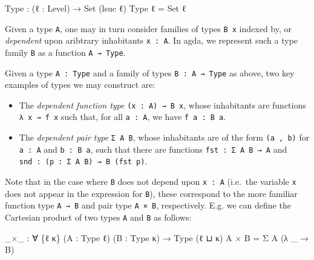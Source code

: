 \documentclass[
  11pt,
  oneside,
  article]{memoir}
\newenvironment{Shaded}{}{}
\newcommand{\DataTypeTok}[1]{\textcolor[rgb]{0.56,0.13,0.00}{#1}}
\newcommand{\NormalTok}[1]{#1}
\newcommand{\OtherTok}[1]{\textcolor[rgb]{0.00,0.44,0.13}{#1}}
\providecommand{\tightlist}{%
  \setlength{\itemsep}{0pt}\setlength{\parskip}{0pt}}
\theoremstyle{definition}
\theoremstyle{plain}
\newcommand{\0}{\textsf{0}}
\newcommand{\1}{\tn{\textsf{1}}}
\begin{document}
\begin{Shaded}
\begin{Highlighting}[]
\NormalTok{Type }\OtherTok{:} \OtherTok{(}\NormalTok{ℓ }\OtherTok{:}\NormalTok{ Level}\OtherTok{)} \OtherTok{→} \DataTypeTok{Set} \OtherTok{(}\NormalTok{lsuc ℓ}\OtherTok{)}
\NormalTok{Type ℓ }\OtherTok{=} \DataTypeTok{Set}\NormalTok{ ℓ}
\end{Highlighting}
\end{Shaded}

Given a type \texttt{A}, one may in turn consider families of types
\texttt{B\ x} indexed by, or \emph{dependent} upon aribtrary inhabitants
\texttt{x\ :\ A}. In agda, we represent such a type family \texttt{B} as
a function \texttt{A\ →\ Type}.

Given a type \texttt{A\ :\ Type} and a family of types
\texttt{B\ :\ A\ →\ Type} as above, two key examples of types we may
construct are:

\begin{itemize}
\tightlist
\item
  The \emph{dependent function type} \texttt{(x\ :\ A)\ →\ B\ x}, whose
  inhabitants are functions \texttt{λ\ x\ →\ f\ x} such that, for all
  \texttt{a\ :\ A}, we have \texttt{f\ a\ :\ B\ a}.
\item
  The \emph{dependent pair type} \texttt{Σ\ A\ B}, whose inhabitants are
  of the form \texttt{(a\ ,\ b)} for \texttt{a\ :\ A} and
  \texttt{b\ :\ B\ a}, such that there are functions
  \texttt{fst\ :\ Σ\ A\ B\ →\ A} and
  \texttt{snd\ :\ (p\ :\ Σ\ A\ B)\ →\ B\ (fst\ p)}.
\end{itemize}

Note that in the case where \texttt{B} does not depend upon
\texttt{x\ :\ A} (i.e.~the variable \texttt{x} does not appear in the
expression for \texttt{B}), these correspond to the more familiar
function type \texttt{A\ →\ B} and pair type \texttt{A\ ×\ B},
respectively. E.g. we can define the Cartesian product of two types
\texttt{A} and \texttt{B} as follows:

\begin{Shaded}
\begin{Highlighting}[]
\OtherTok{\_}\NormalTok{×}\OtherTok{\_} \OtherTok{:} \OtherTok{∀} \OtherTok{\{}\NormalTok{ℓ κ}\OtherTok{\}} \OtherTok{(}\NormalTok{A }\OtherTok{:}\NormalTok{ Type ℓ}\OtherTok{)} \OtherTok{(}\NormalTok{B }\OtherTok{:}\NormalTok{ Type κ}\OtherTok{)} \OtherTok{→}\NormalTok{ Type }\OtherTok{(}\NormalTok{ℓ ⊔ κ}\OtherTok{)}
\NormalTok{A × B }\OtherTok{=}\NormalTok{ Σ A }\OtherTok{(λ} \OtherTok{\_} \OtherTok{→}\NormalTok{ B}\OtherTok{)}
\end{Highlighting}
\end{Shaded}
\end{document}

